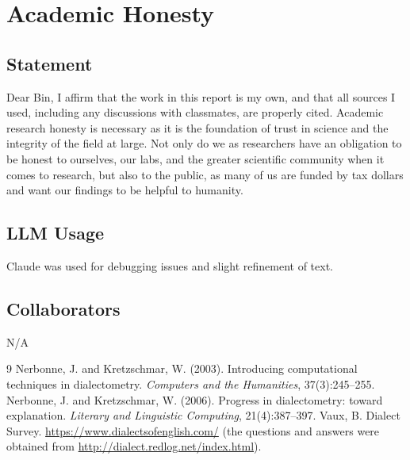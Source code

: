 \documentclass[10pt,letterpaper]{article}
\begin{document}
\section{Academic Honesty}\label{academic-integrity-statement}
 
\subsection{Statement}
 
Dear Bin,
I affirm that the work in this report is my own, and that all sources I used, including any discussions with
classmates, are properly cited. Academic research honesty is necessary as it is the foundation of trust in
science and the integrity of the field at large. Not only do we as researchers have an obligation to be honest
to ourselves, our labs, and the greater scientific community when it comes to research, but also to the public,
as many of us are funded by tax dollars and want our findings to be helpful to humanity.
 
\subsection{LLM Usage}
Claude was used for debugging issues and slight refinement of text.  
\subsection{Collaborators}
 
N/A 

 
\begin{thebibliography}{9}
\small
{} Nerbonne, J. and Kretzschmar, W. (2003). Introducing computational techniques in dialectometry. \emph{Computers and the Humanities}, 37(3):245--255.
 Nerbonne, J. and Kretzschmar, W. (2006). Progress in dialectometry: toward explanation. \emph{Literary and Linguistic Computing}, 21(4):387--397.
 Vaux, B. Dialect Survey. \url{https://www.dialectsofenglish.com/} (the questions and answers were obtained from \url{http://dialect.redlog.net/index.html}).
\end{thebibliography}
 
\end{document}
